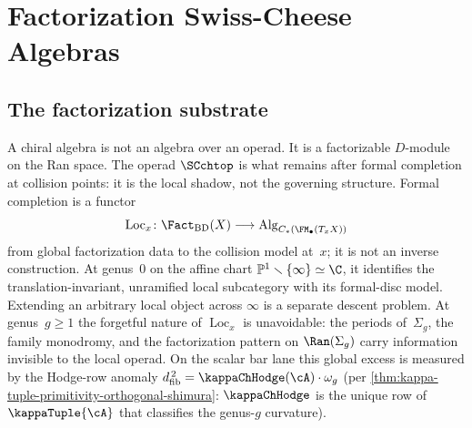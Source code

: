 
\providecommand{\fSet}{\mathsf{fSet}}
\providecommand{\IndCoh}{\operatorname{IndCoh}}
\providecommand{\QCoh}{\operatorname{QCoh}}
\providecommand{\Dmod}{D\text{-}\mathsf{mod}}
\providecommand{\Mbar}{\overline{\cM}}
\providecommand{\colim}{\operatorname{colim}}
\providecommand{\varprojlim}{\underleftarrow{\lim}}
\providecommand{\Obs}{\mathsf{Obs}}
\providecommand{\id}{\mathrm{id}}
\providecommand{\cG}{\mathcal{G}}
\providecommand{\cB}{\mathcal{B}}
\providecommand{\bD}{\mathbb{D}}
\providecommand{\op}{\mathrm{op}}
\providecommand{\PhiFA}{\Phi^{\mathrm{FA}}}
\providecommand{\SpCh}{\mathrm{Sp}_{\mathrm{Ch}}}
\providecommand{\HolFA}{\mathrm{HolFA}}
\providecommand{\EdHolFA}{E_d\text{-}\HolFA}
\providecommand{\EnHolFA}{E_n\text{-}\HolFA}
\providecommand{\intSigma}{\textstyle\int_{\Sigma}}
\providecommand{\hCS}{\mathrm{hCS}}

\chapter{Factorization Swiss-Cheese Algebras}
\label{ch:factorization-swiss-cheese}

\section{The factorization substrate}
\label{sec:factorization-substrate}

A chiral algebra is not an algebra over an operad. It is a
factorizable $D$-module on the Ran space. The operad
$\SCchtop$ is what remains after formal completion at collision
points: it is the local shadow, not the governing structure.
Formal completion is a functor
\[
 \operatorname{Loc}_x\colon
 \Fact_{\mathrm{BD}}(X)
 \longrightarrow
 \operatorname{Alg}_{C_\ast(\FM_\bullet(T_xX))}
\]
from global factorization data to the collision model at~$x$; it is
not an inverse construction. At genus~$0$ on the affine chart
$\mathbb{P}^1\smallsetminus\{\infty\}\simeq\C$, it identifies the
translation-invariant, unramified local subcategory with its
formal-disc model. Extending an arbitrary local object across
$\infty$ is a separate descent problem. At genus~$g \geq 1$ the
forgetful nature of $\operatorname{Loc}_x$ is unavoidable: the periods
of~$\Sigma_g$, the family monodromy, and the factorization pattern on
$\Ran(\Sigma_g)$ carry information invisible to the local operad. On
the scalar bar lane this global excess is measured by the
Hodge-row anomaly
$\dfib^{\,2} = \kappaChHodge(\cA) \cdot \omega_g$ \textup(per
\cref{thm:kappa-tuple-primitivity-orthogonal-shimura}: $\kappaChHodge$
is the unique row of $\kappaTuple{\cA}$ that classifies the
genus-$g$ curvature\textup).

